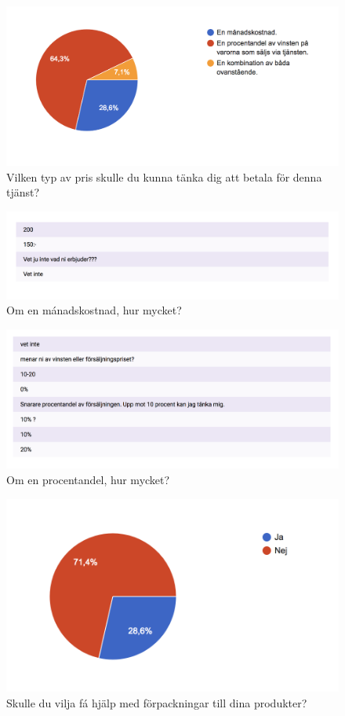 \documentclass[10pt,a4paper,oneside]{article}
\begin{document}
\begin{figure}
	\includegraphics[scale=0.6]{11.png}
	\caption{Vilken typ av pris skulle du kunna t\"anka dig att betala för denna tj\"anst?}
\end{figure}

\begin{figure}
	\includegraphics[scale=0.6]{12.png}
	\caption{Om en m\'anadskostnad, hur mycket?}
\end{figure}

\begin{figure}
	\includegraphics[scale=0.6]{13.png}
	\caption{Om en procentandel, hur mycket?}
\end{figure}

\begin{figure}
	\includegraphics[scale=0.6]{14.png}
	\caption{Skulle du vilja f\'a hj\"alp med f\"orpackningar till dina produkter?}
\end{figure}
\end{document}
